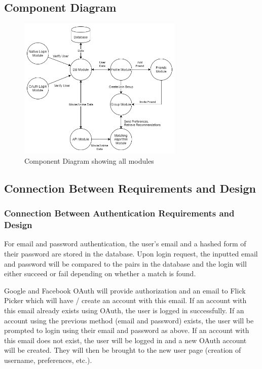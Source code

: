 \documentclass[12pt, titlepage]{article}
\begin{document}
\subsection{Component Diagram}
\begin{figure}[H]
	\centering
	\includegraphics[width=0.7\textwidth]{ComponentDiagram.png}
	\caption{Component Diagram showing all modules}
	\label{FigUH}
\end{figure}

\subsection{Connection Between Requirements and Design} \label{SecConnection}

\subsubsection{Connection Between Authentication Requirements and Design}
\hspace*{14pt} For email and password authentication, the user's email and a hashed form of their password are stored in the database. Upon login request, the inputted email and password will be compared to the pairs in the database and the login will either succeed or fail depending on whether a match is found. 

Google and Facebook OAuth will provide authorization and an email to Flick Picker which will have / create an account with this email. If an account with this email already exists using OAuth, the user is logged in successfully. If an account using the previous method (email and password) exists, the user will be prompted to login using their email and password as above. If an account with this email does not exist, the user will be logged in and a new OAuth account will be created. They will then be brought to the new user page (creation of username, preferences, etc.). 
\end{document}
